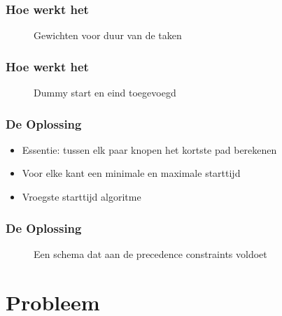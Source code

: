 \documentclass{beamer}
\theoremstyle{definition}
\newcommand{\inputtikz}[1]{}
\begin{document}
\begin{frame}
    	\frametitle{Hoe werkt het}
	
	\begin{figure}[ht]
		\inputtikz{stn}
		\vspace{-1em}
		\caption{Gewichten voor duur van de taken}
	\end{figure}
	
\end{frame}

\begin{frame}
    	\frametitle{Hoe werkt het}
	
	\begin{figure}[ht]
		\makebox[\textwidth][c]{\resizebox{1\paperwidth}{!}{
			\inputtikz{stn_dummy}
		}}
		\vspace{-1em}
		\caption{Dummy start en eind toegevoegd}
	\end{figure}
	
\end{frame}

\begin{frame}
    	\frametitle{De Oplossing}
	\begin{itemize}
		\item Essentie: tussen elk paar knopen het kortste pad berekenen
		\item Voor elke kant een minimale en maximale starttijd
		\item Vroegste starttijd algoritme
	\end{itemize}
	
\end{frame}

\begin{frame}
    	\frametitle{De Oplossing}
	\begin{figure}[ht]
		\inputtikz{schedule_infeasible}
		\vspace{-1em}
		\caption{Een schema dat aan de precedence constraints voldoet}
	\end{figure}
\end{frame}

\section{Probleem}
\end{document}
